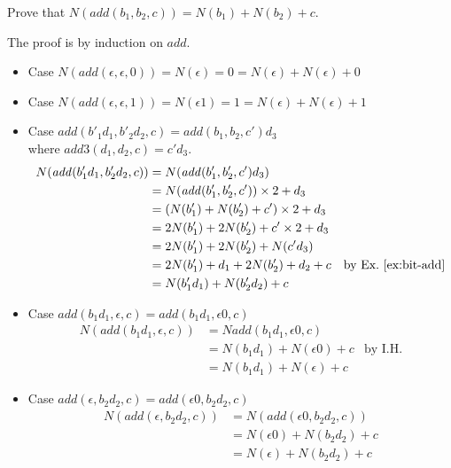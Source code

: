 \documentclass{tufte-handout}
\newcommand{\BR}[1]{(#1)}
\begin{document}
\begin{Exercise}
  \label{ex:add}
  Prove that $N(\mathit{add}(b_1,b_2,c)) = N(b_1) + N(b_2) + c$.
\end{Exercise}
\begin{Answer}
The proof is by induction on $\mathit{add}$.
\begin{itemize}
\item Case $N(\mathit{add}(\epsilon, \epsilon, 0)) = N\BR{\epsilon} = 0
       = N\BR{ \epsilon} + N\BR{ \epsilon} + 0$
\item Case $N(\mathit{add}(\epsilon, \epsilon, 1)) = N\BR{\epsilon 1} = 1
       = N\BR{\epsilon} + N\BR{\epsilon} + 1$
\item Case $\mathit{add}(b'_1 d_1 , b'_2  d_2, c) 
    = \mathit{add}(b_1, b_2, c')d_3$ \\
  where $\mathit{add3}(d_1, d_2, c) = c'd_3$. 
    \begin{align*}
    N(\mathit{add}(b'_1 d_1 , b'_2  d_2, c)) 
      &= N(\mathit{add}(b'_1, b'_2, c')d_3) \\
      &= N(\mathit{add}(b'_1, b'_2, c')) \times 2 + d_3 \\
      &= (N(b'_1) + N(b'_2) + c') \times 2 + d_3\\
      &= 2 N(b'_1) + 2 N(b'_2) + c' \times 2 + d_3 \\
      &= 2 N(b'_1) + 2 N(b'_2) + N\BR{c' d_3} \\
      &= 2 N(b'_1) +  d_1 + 2 N(b'_2) +  d_2 + c 
         & \text{by Ex.~\ref{ex:bit-add}}\\
      &= N \BR{b'_1 d_1} + N \BR{b'_2 d_2} + c
    \end{align*}

\item Case $\mathit{add}(b_1 d_1 , \epsilon, c) = 
  \mathit{add}(b_1 d_1 , \epsilon 0, c)$
  \begin{align*}
    N(\mathit{add}(b_1 d_1 , \epsilon, c))
    & = N\mathit{add}(b_1 d_1 , \epsilon 0, c) \\
    & = N \BR{b_1d_1} + N \BR{\epsilon 0} + c & \text{by I.H.}\\
    & = N \BR{b_1 d_1} + N\BR{\epsilon} + c
  \end{align*}

\item Case $\mathit{add}(\epsilon, b_2 d_2, c) = 
  \mathit{add}( \epsilon 0, b_2 d_2,c)$
  \begin{align*}
    N(\mathit{add}(\epsilon, b_2 d_2, c))
    &= N(\mathit{add}( \epsilon 0, b_2 d_2,c)) \\
    &= N\BR{\epsilon 0} + N\BR{b_2 d_2} + c \\
    &= N\BR{\epsilon} + N\BR{b_2 d_2} + c
  \end{align*}

\end{itemize}
\end{Answer}
\end{document}
